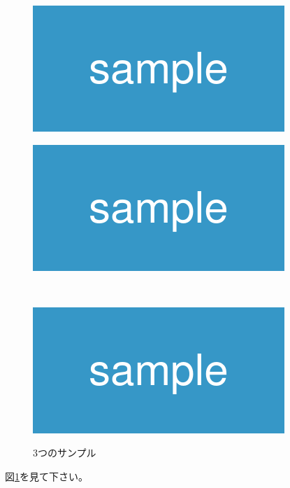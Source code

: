 \documentclass[11pt]{jsarticle}
\begin{document}
\begin{figure}
  \begin{minipage}{0.45\linewidth}
    \centering
    \includegraphics[keepaspectratio, width=0.5\linewidth]{figures/sample.png}
    \label{sample1}
  \end{minipage}
  \begin{minipage}{0.45\linewidth}
    \centering
    \includegraphics[keepaspectratio, width=0.5\linewidth]{figures/sample.png}
    \label{sammple2}
  \end{minipage} \\
  \begin{minipage}{0.45\linewidth}
    \centering
    \includegraphics[keepaspectratio, width=0.5\linewidth]{figures/sample.png}
    \label{sample3}
  \end{minipage}
  \caption{3つのサンプル}
  \label{sample*3}
\end{figure}

図\ref{sample*3}を見て下さい。
\end{document}
